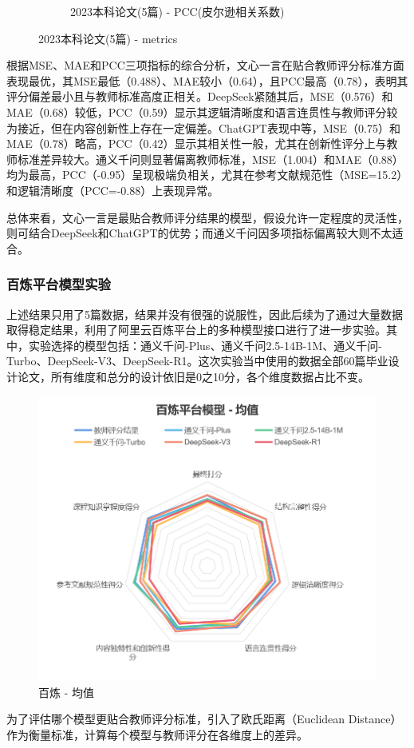 \documentclass{article}
\begin{document}
\begin{figure}[h!]
\begin{subfigure}{0.3\linewidth}
		\caption{2023本科论文(5篇) - PCC(皮尔逊相关系数)}
		\label{fig:webui-2023(5)-PCC}
	\end{subfigure}
	\caption{2023本科论文(5篇) - metrics}
		\label{fig:webui-2023(5)-metrics}
\end{figure}

根据MSE、MAE和PCC三项指标的综合分析，文心一言在贴合教师评分标准方面表现最优，其MSE最低（0.488）、MAE较小（0.64），且PCC最高（0.78），表明其评分偏差最小且与教师标准高度正相关。DeepSeek紧随其后，MSE（0.576）和MAE（0.68）较低，PCC（0.59）显示其逻辑清晰度和语言连贯性与教师评分较为接近，但在内容创新性上存在一定偏差。ChatGPT表现中等，MSE（0.75）和MAE（0.78）略高，PCC（0.42）显示其相关性一般，尤其在创新性评分上与教师标准差异较大。通义千问则显著偏离教师标准，MSE（1.004）和MAE（0.88）均为最高，PCC（-0.95）呈现极端负相关，尤其在参考文献规范性（MSE=15.2）和逻辑清晰度（PCC=-0.88）上表现异常。

总体来看，文心一言是最贴合教师评分结果的模型，假设允许一定程度的灵活性，则可结合DeepSeek和ChatGPT的优势；而通义千问因多项指标偏离较大则不太适合。

 \subsubsection{百炼平台模型实验}

上述结果只用了5篇数据，结果并没有很强的说服性，因此后续为了通过大量数据取得稳定结果，利用了阿里云百炼平台上的多种模型接口进行了进一步实验。其中，实验选择的模型包括：通义千问-Plus、通义千问2.5-14B-1M、通义千问-Turbo、DeepSeek-V3、DeepSeek-R1。这次实验当中使用的数据全部60篇毕业设计论文，所有维度和总分的设计依旧是0之10分，各个维度数据占比不变。

\begin{figure}
    \centering
    \includegraphics[width=0.5\linewidth]{img/bailian-average.png}
    \caption{百炼 - 均值}
    \label{fig:bailian-average}
\end{figure}

为了评估哪个模型更贴合教师评分标准，引入了欧氏距离（Euclidean Distance）作为衡量标准，计算每个模型与教师评分在各维度上的差异。 
\end{document}
